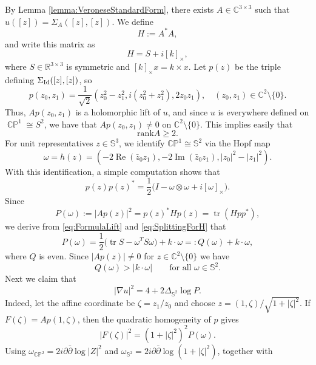 \documentclass[11pt]{article}
\theoremstyle{plain}
\numberwithin{equation}{section}
\theoremstyle{definition}
\let\oldendproof\endproof
\renewenvironment{proof}[1][\proofname]{%
\oldproof[\upshape \bfseries #1]%
}{\oldendproof}
\renewcommand{\Re}{\operatorname{Re}}
\renewcommand{\Im}{\operatorname{Im}}
\def \R {\mathbb{R}}
\def \C{\mathbb{C}}
\def \p{\partial}
\def \mb{\mathbb}
\def \Id{\textup{Id}}
\DeclareMathOperator{\CP}{\mathbb{CP}}
\DeclareMathOperator{\tr}{tr}
\begin{document}
\begin{proof}
By Lemma \ref{lemma:VeroneseStandardForm}, there exists
$A\in\C^{3\times 3}$ such that $u([z])=\Sigma_A([z],[z])$. We define
\[
H:=A^*A,
\]
and write this matrix as
\begin{equation}
    \label{eq:SplittingForH}
    H=S+i[k]_\times,
\end{equation}
where $S\in\R^{3\times 3}$ is symmetric and
$[k]_\times x=k\times x$. Let $p(z)$ be the triple defining $\Sigma_{\Id}([z],[z])$, so
\[
p(z_0,z_1)=\frac{1}{\sqrt{2}}(z_0^2-z_1^2,i(z_0^2+z_1^2),2z_0z_1),\quad (z_0,z_1)\in \C^2\setminus \{0\}.
\]
Thus, $Ap(z_0,z_1)$ is a holomorphic lift of $u$, and since $u$ is everywhere defined on $\CP^1\cong S^2$, we have that $Ap(z_0,z_1)\neq 0$ on $\mb C^2\setminus \{0\}$. This implies easily that 
\begin{equation}
    \label{ineq:rkGreater2}
    \mathrm{rank }A\geq 2.
\end{equation}
For unit representatives $z\in\mb S^3$, we identify \(\mathbb{CP}^1\cong\mathbb S^2\) via the Hopf map 
\[
\omega=h(z)=(-2\Re(\bar z_0 z_1),-2\Im(\bar z_0z_1),|z_0|^2-|z_1|^2).
\]
With this identification, a simple computation shows that
\begin{equation}
    \label{eq:FormulaLift}
    p(z)p(z)^*
    =\frac12\bigl(I-\omega\otimes\omega+i[\omega]_\times\bigr).
\end{equation}
Since 
\[
P(\omega):=|Ap(z)|^2=p(z)^*Hp(z)=\tr(Hpp^*),
\]
we derive from \eqref{eq:FormulaLift} and \eqref{eq:SplittingForH} that
\begin{equation}
    \label{eq:FormulaforP}
    P(\omega)=\frac12\big(\tr S-\omega^TS\omega\big)+k\cdot\omega
    =:Q(\omega)+k\cdot\omega,
\end{equation}
where $Q$ is even. Since $|Ap(z)|\neq 0$ for $z \in \C^2 \setminus\{0\}$ we have
\begin{equation}
    \label{QLowerBound}
    Q(\omega)>\lvert k\cdot\omega\rvert
\qquad\text{for all }\omega\in\mathbb S^2.
\end{equation}
Next we claim that
\begin{equation}
    \label{formulaNormIntermsOfLaplace}
    |\nabla u|^2=4+2\Delta_{\mathbb S^2}\log P.
\end{equation}
Indeed, let the affine coordinate be $\zeta=z_1/z_0$ and choose $z=(1,\zeta)/\sqrt{1+|\zeta|^2}$. If $F(\zeta)=Ap(1,\zeta)$, then the
quadratic homogeneity of $p$ gives
\[
|F(\zeta)|^2=(1+|\zeta|^2)^2P(\omega).
\]
Using $\omega_{\CP^2}=2i\p\bar\p\log|Z|^2$ and
$\omega_{\mb S^2}=2i\p\bar\p\log(1+|\zeta|^2)$, together with

\end{proof}
\end{document}
